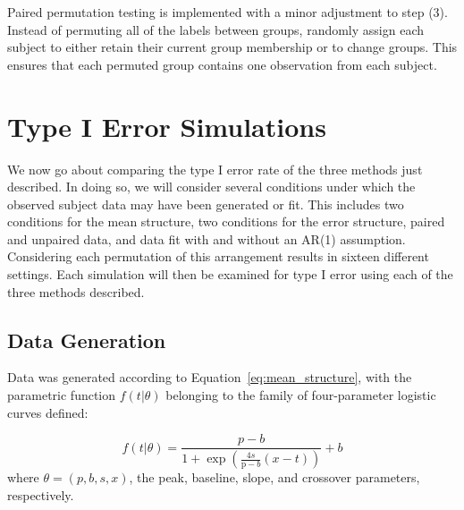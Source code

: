 \documentclass{article}
\begin{document}
Paired permutation testing is implemented with a minor adjustment to step (3). Instead of permuting all of the labels between groups, randomly assign each subject to either retain their current group membership or to change groups. This ensures that each permuted group contains one observation from each subject.



\section{Type I Error Simulations}

We now go about comparing the type I error rate of the three methods just described. In doing so, we will consider several conditions under which the observed subject data may have been generated or fit. This includes two conditions for the mean structure, two conditions for the error structure, paired and unpaired data, and data fit with and without an AR(1) assumption. Considering each permutation of this arrangement results in sixteen different settings. Each simulation will then be examined for type I error using each of the three methods described.



\subsection{Data Generation}

Data was generated according to Equation~\ref{eq:mean_structure}, with the parametric function $f(t|\theta)$ belonging to the family of four-parameter logistic curves defined:

\begin{equation}\label{eq:logistic}
f(t | \theta) = \frac{p-b}{1 + \exp \left(\frac{4s}{\text{p}-b} (x - t) \right)} + b
\end{equation}
where $\theta = (p, b, s, x)$, the peak, baseline, slope, and crossover parameters, respectively.
\end{document}
